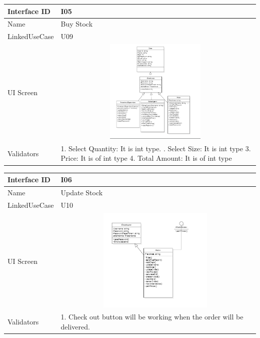 \documentclass[12pt]{article}
\begin{document}
\begin{table}[H] 
\begin{tabular} {|m{6em}|m{12cm}|}
\hline
Interface ID & I05 \\ \hline
\newline
Name & Buy Stock\\ \hline
LinkedUseCase & U09 \\ \hline
UI Screen &\newline \includegraphics [width=10cm, height=5cm] {5.png} \\ \hline
Validators &  1. Select Quantity: It is int type.
\newline
2. Select Size: It is int type
3. Price: It is of int type
4. Total Amount: It is of int type
\\ \hline
\end{tabular}
\end{table}

\begin{table}[H] 
\begin{tabular} {|m{6em}|m{12cm}|}
\hline
Interface ID & I06 \\ \hline
\newline
Name & Update Stock\\ \hline
LinkedUseCase & U10 \\ \hline
UI Screen &\newline \includegraphics [width=10cm, height=5cm] {6.png} \\ \hline
Validators &  1. Check out button will be working when the order will be delivered.
\\ \hline
\end{tabular}
\end{table}
\end{document}
